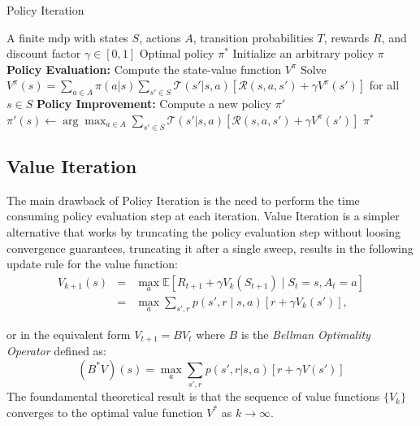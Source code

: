 \begin{algorithm}[H]
    \caption{Policy Iteration}\label{alg:policy-iteration}
    \begin{algorithmic}
    \Require A finite \gls{mdp} with states $S$, actions $A$, transition probabilities $T$, rewards $R$, and discount factor $\gamma \in [0,1]$
    \Ensure Optimal policy $\pi^*$
    \State Initialize an arbitrary policy $\pi$
    \Repeat
        \State \textbf{Policy Evaluation:} Compute the state-value function $V^\pi$
        \State Solve $V^\pi(s) = \sum_{a \in A} \pi(a|s) \sum_{s' \in S} \mathcal{T}(s' | s, a) \left[ \mathcal{R}(s, a, s') + \gamma V^\pi(s') \right]$ for all $s \in S$
        \State \textbf{Policy Improvement:} Compute a new policy $\pi'$
            \State $\pi'(s) \gets \arg\max_{a \in A} \sum_{s' \in S} \mathcal{T}(s' | s, a) \left[ \mathcal{R}(s, a, s') + \gamma V^\pi(s') \right]$
        \EndFor
      
    \State \Return $\pi^*$
    \end{algorithmic}
\end{algorithm}

\subsection{Value Iteration}
The main drawback of Policy Iteration is the need to perform the time consuming policy 
evaluation step at each iteration.
Value Iteration is a simpler alternative that works by truncating the policy evaluation step 
without loosing convergence guarantees, truncating it after a single sweep, results in the following update rule for the 
value function:
\[
\begin{array}{lll}
V_{k+1}(s) & = & \displaystyle \max_{a} \mathbb{E}[R_{t+1}+\gamma V_k(S_{t+1}) \mid S_t=s, A_t=a] \\ 
& = & \displaystyle \max_{a} \sum\limits_{s',r} p(s',r \mid s, a) \left[r+\gamma V_k(s')\right],
\end{array}
\]

or in the equivalent form $V_{t+1} = BV_t$
where $B$ is the \emph{Bellman Optimality Operator} defined as: 
\begin{equation}
    (B^*V)(s) = \max_{a} \sum_{s',r} p(s',r|s,a) \left[ r + \gamma V(s') \right]
    \label{eq:bellman-operator}
\end{equation}
The foundamental theoretical result is that the sequence of value functions $\{V_k\}$ converges to the optimal
value function $V^*$ as $k \rightarrow \infty$.

